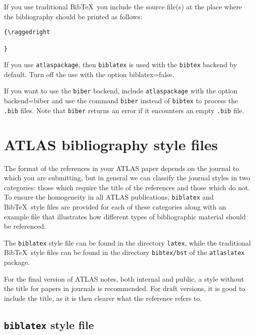 \documentclass[UKenglish,texlive=2013]{latex/atlasdoc}
\newcommand*{\BibTeX}{Bib\TeX}
\newcommand{\File}[1]{\texttt{#1}\xspace}
\newcommand{\Option}[1]{\textsf{#1}\xspace}
\newcommand{\Package}[1]{\texttt{#1}\xspace}
\begin{document}
If you use traditional \BibTeX\ you include the source file(s) at the place where the bibliography should be printed as follows:
%
\begin{verbatim}
{\raggedright
  
}
\end{verbatim}

If you use \Package{atlaspackage}, then \Package{biblatex} is used with the \texttt{bibtex} backend by default.
Turn off the use with the option \Option{biblatex=false}.

If you want to use the \Package{biber} backend, include \Package{atlaspackage} with the option \Option{backend=biber} and
use the command \texttt{biber} instead of \texttt{bibtex} to process the \texttt{.bib} files.
Note that \texttt{biber} returns an error if it encounters an empty \texttt{.bib} file.


\section{ATLAS bibliography style files}
\label{sec:atlasbst}

The format of the references in your ATLAS paper depends on the journal to which you are submitting,
but in general we can classify the journal styles in two categories: 
those which require the title of the references and those which do not. 
To ensure the homogeneity in all ATLAS publications, 
\Package{biblatex} and \BibTeX\ style files are provided for each of these categories 
along with an example file that illustrates how different types of bibliographic material should be referenced.

The \Package{biblatex} style file can be found in the directory \File{latex},
while the traditional \BibTeX\ style files can be found in the directory \File{bibtex/bst} of the \Package{atlaslatex} package.

For the final version of ATLAS notes, both internal and public, a style without the title for papers in journals is recommended.
For draft versions, it is good to include the title, as it is then clearer what the reference refers to.


\subsection{\Package{biblatex} style file}
\end{document}
